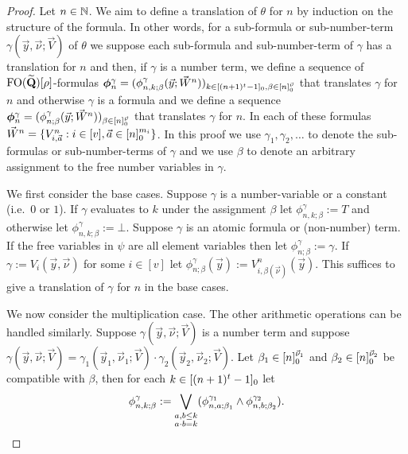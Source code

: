 \documentclass[../main/thesis.tex]{subfiles}
\begin{document}
\begin{proof}
  Let $n \in \mathbb{N}$. We aim to define a translation of $\theta$ for $n$ by
  induction on the structure of the formula. In other words, for a sub-formula
  or sub-number-term $\gamma(\vec{y}, \vec{\nu} ; \vec{V})$ of $\theta$ we
  suppose each sub-formula and sub-number-term of $\gamma$ has a translation for
  $n$ and then, if $\gamma$ is a number term, we define a sequence of
  $\text{\upshape FO} (\widetilde{\mathbf{Q}})[\rho]$-formulas $\boldsymbol{\phi}^{\gamma}_n =
  (\phi^{\gamma}_{n, k; \beta}(\vec{y}; \vec{W}^n))_{k \in [(n + 1)^{t} - 1]_0,
    \beta \in [n]^{\vec{\nu}}_0}$ that translates $\gamma$ for $n$ and
  otherwise $\gamma$ is a formula and we define a sequence
  $\boldsymbol{\phi}^{\gamma}_n = (\phi^{\gamma}_{n ; \beta}(\vec{y};
  \vec{W}^n))_{\beta \in [n]^{ \vec{\nu}}_0}$ that translates $\gamma$
  for $n$. In each of these formulas $\vec{W}^n = \{ V^n_{i, \vec{a}} : i \in
  [v], \vec{a} \in [n]^{m_i}_0\}$. In this proof we use $\gamma_1,
  \gamma_2, \ldots$ to denote the sub-formulas or sub-number-terms of $\gamma$
  and we use $\beta$ to denote an arbitrary assignment to the free number
  variables in $\gamma$.

  We first consider the base cases. Suppose $\gamma$ is a number-variable or a
  constant (i.e.\ $0$ or $1$). If $\gamma$ evaluates to $k$ under the assignment
  $\beta$ let $\phi^{\gamma}_{n, k; \beta} := T$ and otherwise let
  $\phi^{\gamma}_{n, k; \beta} := \bot$. Suppose $\gamma$ is an atomic formula
  or (non-number) term. If the free variables in $\psi$ are all element
  variables then let $\phi^{\gamma}_{n; \beta} := \gamma$. If $\gamma :=
  V_i(\vec{y}, \vec{\nu})$ for some $i \in [v]$ let $\phi^{\gamma}_{n;
    \beta}(\vec{y}) := V^n_{i, \beta(\vec{\nu})}(\vec{y})$. This suffices to
  give a translation of $\gamma$ for $n$ in the base cases.

  We now consider the multiplication case. The other arithmetic operations can
  be handled similarly. Suppose $\gamma(\vec{y}, \vec{\nu}; \vec{V})$ is a
  number term and suppose $\gamma(\vec{y}, \vec{\nu}; \vec{V}) =
  \gamma_1(\vec{y}_1, \vec{\nu}_1; \vec{V}) \cdot \gamma_2(\vec{y}_2,
  \vec{\nu}_2; \vec{V})$. Let $\beta_1 \in [n]^{\vec{\nu}_1}_0$ and
  $\beta_2 \in [n]^{\vec{\nu}_2}_0$ be compatible with $\beta$, then for
  each $k \in [(n + 1)^{t} - 1]_0$ let
  \begin{align*}
    \phi^{\gamma}_{n, k ; \beta} :=
    \underset{\substack{a, b \leq k \\  a \cdot b = k}}{\bigvee}(\phi^{\gamma_1}_{n, a;
    \beta_1} \land \phi^{\gamma_2}_{n, b; \beta_2}).
  \end{align*}


\end{proof}
\end{document}
